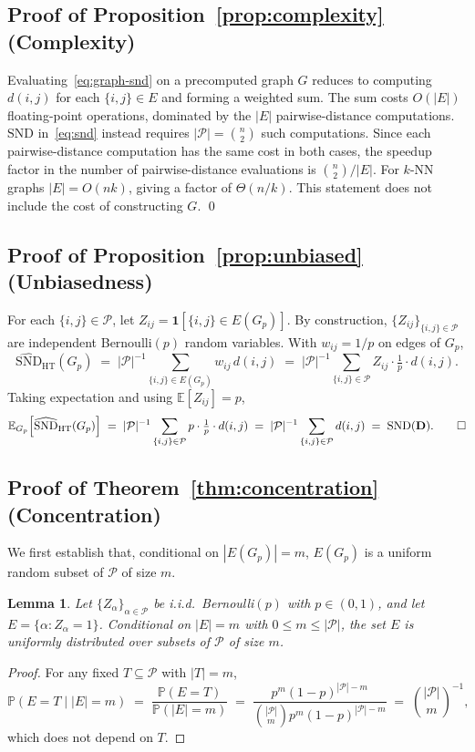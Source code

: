 \documentclass{article}
\theoremstyle{plain}
\newtheorem{lemma}[theorem]{Lemma}
\theoremstyle{definition}
\theoremstyle{remark}
\newcommand{\E}{\mathbb{E}}
\newcommand{\Prob}{\mathbb{P}}
\newcommand{\Pairs}{\mathcal{P}}         %
\newcommand{\SND}{\ensuremath{\mathrm{SND}}}
\newcommand{\ind}{\mathbf{1}}
\begin{document}
\subsection*{Proof of Proposition~\ref{prop:complexity} (Complexity)}

Evaluating~\eqref{eq:graph-snd} on a precomputed graph $G$ reduces to
computing $d(i,j)$ for each $\{i,j\} \in E$ and forming a weighted sum. The
sum costs $O(|E|)$ floating-point operations, dominated by the $|E|$
pairwise-distance computations. $\SND$ in~\eqref{eq:snd} instead requires
$|\Pairs| = \binom{n}{2}$ such computations. Since each pairwise-distance
computation has the same cost in both cases, the speedup factor in the
number of pairwise-distance evaluations is $\binom{n}{2}/|E|$. For $k$-NN
graphs $|E| = O(nk)$, giving a factor of $\Theta(n/k)$. This statement
does not include the cost of constructing $G$. \qed

\subsection*{Proof of Proposition~\ref{prop:unbiased} (Unbiasedness)}

For each $\{i,j\} \in \Pairs$, let $Z_{ij} = \ind[\{i,j\} \in E(G_p)]$.
By construction, $\{Z_{ij}\}_{\{i,j\} \in \Pairs}$ are independent
Bernoulli$(p)$ random variables. With $w_{ij} = 1/p$ on edges of $G_p$,
\[
\widehat{\SND}_{\mathrm{HT}}(G_p)
\;=\; |\Pairs|^{-1} \sum_{\{i,j\} \in E(G_p)} w_{ij}\, d(i,j)
\;=\; |\Pairs|^{-1} \sum_{\{i,j\} \in \Pairs} Z_{ij} \cdot \tfrac{1}{p}
\cdot d(i,j).
\]
Taking expectation and using $\E[Z_{ij}] = p$,
\[
\E_{G_p}\!\left[\widehat{\SND}_{\mathrm{HT}}(G_p)\right]
\;=\; |\Pairs|^{-1} \sum_{\{i,j\} \in \Pairs}
p \cdot \tfrac{1}{p} \cdot d(i,j)
\;=\; |\Pairs|^{-1} \sum_{\{i,j\} \in \Pairs} d(i,j)
\;=\; \SND(\mathbf{D}). \qed
\]

\subsection*{Proof of Theorem~\ref{thm:concentration} (Concentration)}

We first establish that, conditional on $|E(G_p)| = m$, $E(G_p)$ is a
uniform random subset of $\Pairs$ of size $m$.

\begin{lemma}
\label{lem:conditional-uniform}
Let $\{Z_\alpha\}_{\alpha \in \Pairs}$ be i.i.d.\ Bernoulli$(p)$ with
$p \in (0,1)$, and let $E = \{\alpha : Z_\alpha = 1\}$. Conditional on
$|E| = m$ with $0 \leq m \leq |\Pairs|$, the set $E$ is uniformly
distributed over subsets of $\Pairs$ of size $m$.
\end{lemma}
\begin{proof}
For any fixed $T \subseteq \Pairs$ with $|T| = m$,
\[
\Prob(E = T \mid |E| = m)
\;=\; \frac{\Prob(E = T)}{\Prob(|E| = m)}
\;=\; \frac{p^m (1-p)^{|\Pairs|-m}}
          {\binom{|\Pairs|}{m} p^m (1-p)^{|\Pairs|-m}}
\;=\; \binom{|\Pairs|}{m}^{-1},
\]
which does not depend on $T$.
\end{proof}
\end{document}
